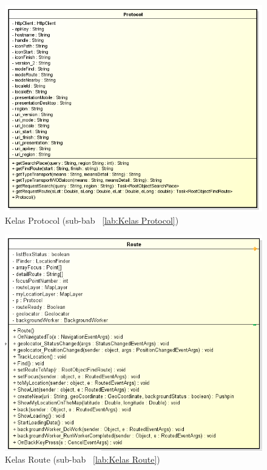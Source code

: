 \newpage

\begin{figure}[h!]
	\centering
		\includegraphics[scale=0.7]{Gambar/useCase_dan_Class/perClass/protocol}
	\caption{Kelas Protocol (sub-bab ~\ref{lab:Kelas Protocol})}
	\label{fig:kelaslProtocol}
\end{figure}

\begin{figure}[h!]
	\centering
		\includegraphics[scale=0.7]{Gambar/useCase_dan_Class/perClass/route}
	\caption{Kelas Route (sub-bab ~\ref{lab:Kelas Route})}
	\label{fig:kelaslRoute}
\end{figure}

